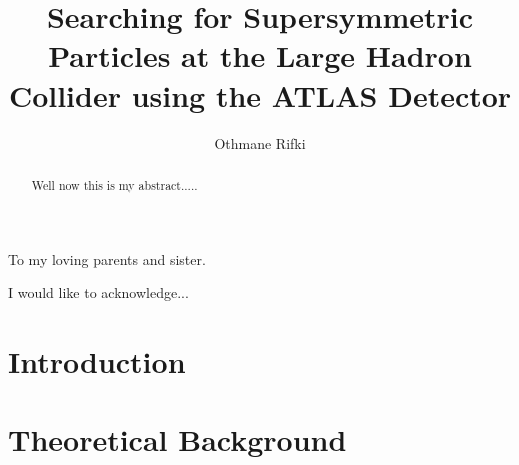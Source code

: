 \documentclass{outhesis}
\begin{document}
\author{Othmane Rifki}
\title{Searching for Supersymmetric Particles at the Large Hadron Collider using the ATLAS Detector}
\address{Norman, Oklahoma}

\begin{dedication}
  To my loving parents and sister.
\end{dedication}

\begin{acknowledgements}
  I would like to acknowledge...
\end{acknowledgements}


\begin{abstract}
Well now this is my abstract.....
\end{abstract}


\frontmatter

\maketitle

\mainmatter


\chapter*{Introduction}\label{sec:intro}


\chapter{Theoretical Background}\label{sec:theory}

\end{document}
